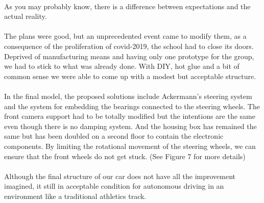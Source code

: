 \paragraph{}
As you may probably know, there is a difference between expectations and the
actual reality.

\paragraph{}
The plans were good, but an unprecedented event came to modify them, as a
consequence of the proliferation of covid-2019, the school had to close its
doors. Deprived of manufacturing means and having only one prototype for the
group, we had to stick to what was already done. With DIY, hot glue and a
bit of common sense we were able to come up with a modest but acceptable
structure.

\paragraph{}
In the final model, the proposed solutions include Ackermann's steering
system and the system for embedding the bearings connected to the steering
wheels. The front camera support had to be totally modified but the intentions
are the same even though there is no damping system. And the housing box has
remained the same but has been doubled on a second floor to contain the
electronic components.
By limiting the rotational movement of the steering wheels, we can ensure
that the front wheels do not get stuck. (See Figure 7 for more details)

\paragraph{}
Although the final structure of our car does not have all the improvement
imagined, it still in acceptable condition for autonomous driving in an
environment like a traditional athletics track.


